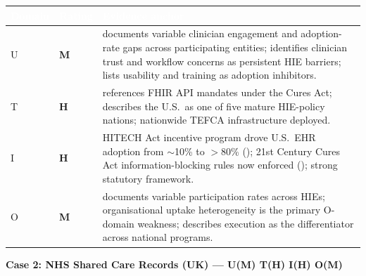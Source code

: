 \begin{table}[H]
\footnotesize
\begin{tabular}{p{1.2cm} >{\centering\arraybackslash}p{1.4cm} p{12.5cm}}
\toprule
\rowcolor{headerblue}
\textcolor{white}{\textbf{Domain}} &
\textcolor{white}{\textbf{Rating}} &
\textcolor{white}{\textbf{Evidence anchor}} \\
\midrule
\rowcolor{rowgray}
U & \cellcolor{medamber}\textcolor{medambertext}{\textbf{M}} &
\cite{onc2025reports} documents variable clinician engagement and adoption-rate gaps across participating entities; \cite{eden2016barriers} identifies clinician trust and workflow concerns as persistent HIE barriers; \cite{kruse2016adoption} lists usability and training as adoption inhibitors. \\
T & \cellcolor{highgreen}\textcolor{highgreentext}{\textbf{H}} &
\cite{onc2025reports} references FHIR API mandates under the Cures Act; \cite{holmgren2023policyhie} describes the U.S.\ as one of five mature HIE-policy nations; nationwide TEFCA infrastructure deployed. \\
\rowcolor{rowgray}
I & \cellcolor{highgreen}\textcolor{highgreentext}{\textbf{H}} &
HITECH Act incentive program drove U.S.\ EHR adoption from $\sim$10\% to $>$80\% (\cite{onc2025reports}); 21st Century Cures Act information-blocking rules now enforced (\cite{holmgren2023policyhie}); strong statutory framework. \\
O & \cellcolor{medamber}\textcolor{medambertext}{\textbf{M}} &
\cite{onc2025reports} documents variable participation rates across HIEs; organisational uptake heterogeneity is the primary O-domain weakness; \cite{fennelly2020national} describes execution as the differentiator across national programs. \\
\bottomrule
\end{tabular}
\end{table}

\medskip

\noindent\textbf{Case 2: NHS Shared Care Records (UK) --- U(M) T(H) I(H) O(M)}

